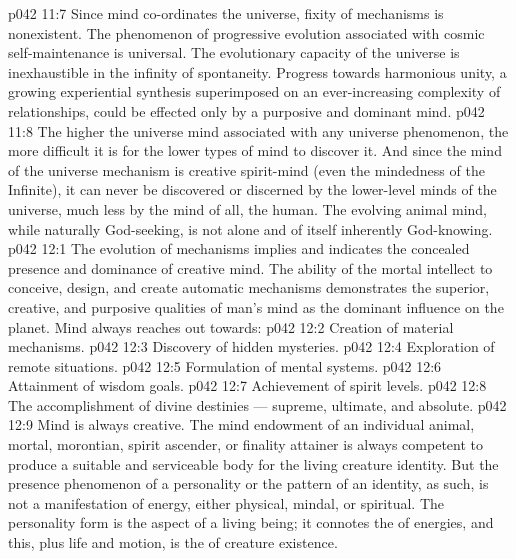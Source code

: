 \vs p042 11:7 Since mind co\hyp{}ordinates the universe, fixity of mechanisms is nonexistent. The phenomenon of progressive evolution associated with cosmic self\hyp{}maintenance is universal. The evolutionary capacity of the universe is inexhaustible in the infinity of spontaneity. Progress towards harmonious unity, a growing experiential synthesis superimposed on an ever\hyp{}increasing complexity of relationships, could be effected only by a purposive and dominant mind.
\vs p042 11:8 The higher the universe mind associated with any universe phenomenon, the more difficult it is for the lower types of mind to discover it. And since the mind of the universe mechanism is creative spirit\hyp{}mind (even the mindedness of the Infinite), it can never be discovered or discerned by the lower\hyp{}level minds of the universe, much less by the  mind of all, the human. The evolving animal mind, while naturally God\hyp{}seeking, is not alone and of itself inherently God\hyp{}knowing.
\vs p042 12:1 The evolution of mechanisms implies and indicates the concealed presence and dominance of creative mind. The ability of the mortal intellect to conceive, design, and create automatic mechanisms demonstrates the superior, creative, and purposive qualities of man’s mind as the dominant influence on the planet. Mind always reaches out towards:
\vs p042 12:2 \bibnobreakspace Creation of material mechanisms.
\vs p042 12:3 \bibnobreakspace Discovery of hidden mysteries.
\vs p042 12:4 \bibnobreakspace Exploration of remote situations.
\vs p042 12:5 \bibnobreakspace Formulation of mental systems.
\vs p042 12:6 \bibnobreakspace Attainment of wisdom goals.
\vs p042 12:7 \bibnobreakspace Achievement of spirit levels.
\vs p042 12:8 \bibnobreakspace The accomplishment of divine destinies --- supreme, ultimate, and absolute.
\vs p042 12:9 \pc Mind is always creative. The mind endowment of an individual animal, mortal, morontian, spirit ascender, or finality attainer is always competent to produce a suitable and serviceable body for the living creature identity. But the presence phenomenon of a personality or the pattern of an identity, as such, is not a manifestation of energy, either physical, mindal, or spiritual. The personality form is the  aspect of a living being; it connotes the  of energies, and this, plus life and motion, is the  of creature existence.
